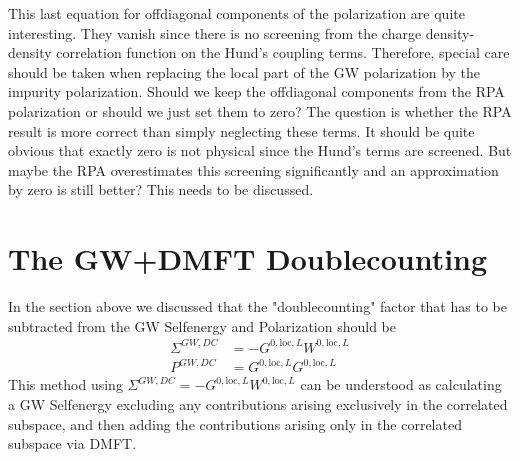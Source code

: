 \documentclass[12pt,a4paper]{scrartcl}
\numberwithin{equation}{section}
\begin{document}
This last equation for offdiagonal components of the polarization 
are quite interesting. They vanish since there is no screening from 
the charge density-density correlation function on the Hund's coupling terms.
Therefore, special care should be taken when replacing the local part
of the GW polarization by the impurity polarization. Should we keep the offdiagonal
components from the RPA polarization or should we just set them to zero?
The question is whether the RPA result is more correct than simply neglecting these terms.
It should be quite obvious that exactly zero is not physical since the Hund's terms
are screened. But maybe the RPA overestimates this screening significantly and 
an approximation by zero is still better?
This needs to be discussed.




\section{The GW+DMFT Doublecounting}
In the section above we discussed that the "doublecounting" factor
that has to be subtracted from the GW Selfenergy and Polarization
should be 
\begin{align}
\Sigma^{GW,DC} &= -G^{0,\mathrm{loc},L}W^{0,\mathrm{loc},L} \\
P^{GW,DC} &= G^{0,\mathrm{loc},L}G^{0,\mathrm{loc},L}
\end{align}
This method using $\Sigma^{GW,DC} = -G^{0,\mathrm{loc},L}W^{0,\mathrm{loc},L}$
can be understood as calculating a GW Selfenergy excluding any contributions arising
exclusively in the correlated subspace, and then adding the contributions arising only in
the correlated subspace via DMFT. 
\end{document}
